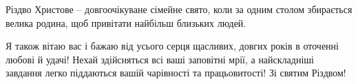 Різдво Христове – довгоочікуване сімейне свято, коли за одним столом збирається
велика родина, щоб привітати найбільш близьких людей.

Я також вітаю вас і бажаю від усього серця щасливих, довгих років в оточенні
любові й удачі! Нехай здійсняться всі ваші заповітні мрії, а найскладніші
завдання легко піддаються вашій чарівності та працьовитості! Зі святим Різдвом!

